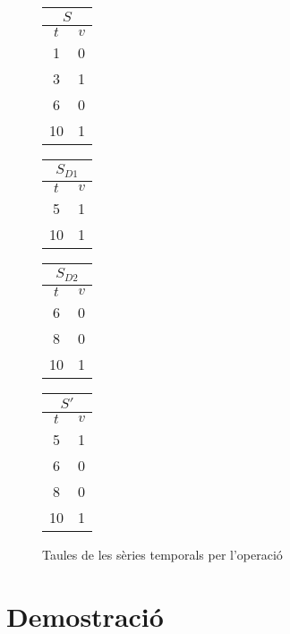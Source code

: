 \begin{example}
\begin{figure}[tp]
  \centering
  \begin{tabular}[c]{|c|c|}
    \multicolumn{2}{c}{$S$} \\ \hline
    $t$  & $v$ \\ \hline
    1  & 0 \\
    3  & 1 \\
    6  & 0 \\
    10  & 1 \\ \hline
  \end{tabular} \qquad
  \begin{tabular}[c]{|c|c|}
    \multicolumn{2}{c}{$S_{D1}$} \\ \hline
    $t$  & $v$ \\ \hline
    5  & 1 \\
    10  & 1 \\ \hline
  \end{tabular} \qquad
  \begin{tabular}[c]{|c|c|}
    \multicolumn{2}{c}{$S_{D2}$} \\ \hline
    $t$  & $v$ \\ \hline
    6  & 0 \\
    8  & 0 \\
    10  & 1 \\ \hline
  \end{tabular} \qquad
  \begin{tabular}[c]{|c|c|}
    \multicolumn{2}{c}{$S'$} \\ \hline
    $t$  & $v$ \\ \hline
    5  & 1 \\
    6  & 0 \\
    8  & 0 \\
    10  & 1 \\ \hline
  \end{tabular}
  \caption{Taules de les sèries temporals per l'operació }
  \label{fig:multiresolucio:multiresolucio}
\end{figure}
 


\end{example}








\section{Demostració}

